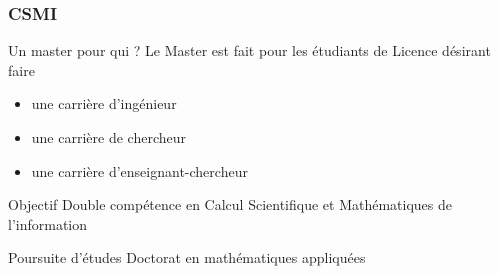 



\begin{frame}
  \frametitle{CSMI}
  \begin{block}{Un master pour qui ?}
    Le Master est fait pour les étudiants de Licence désirant faire
    \begin{itemize}
    \item une carrière d'ingénieur
    \item une carrière de chercheur
    \item une carrière d'enseignant-chercheur
    \end{itemize}
  \end{block}
  
  
  \begin{block}{Objectif}
  Double compétence en Calcul Scientifique et Mathématiques de l'information
  \end{block}

  \begin{block}{Poursuite d'études}
    Doctorat en mathématiques appliquées
  \end{block}
\end{frame}


